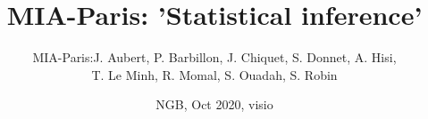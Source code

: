 \documentclass[8pt]{beamer}
\begin{document}
\title{MIA-Paris: 'Statistical inference'}
\author[MIA-Paris]{
\begin{tabular}{ll}
  MIA-Paris: & J. Aubert, P. Barbillon, J. Chiquet, S. Donnet, A. Hisi, \\
  & T. Le Minh, R. Momal, S. Ouadah, S. Robin
\end{tabular}}
\date[NGB, Oct'20]{NGB, Oct 2020, visio}
\maketitle


\end{document}
